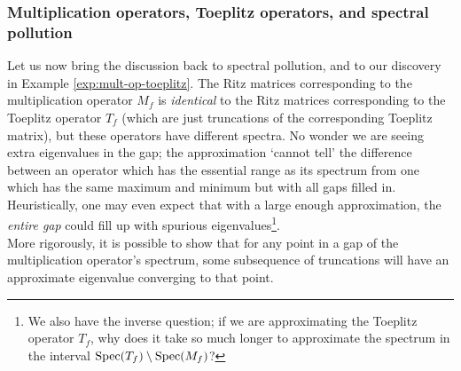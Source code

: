 \documentclass[../main.tex]{subfiles}
\begin{document}
\subsubsection{Multiplication operators, Toeplitz operators, and spectral pollution}
Let us now bring the discussion back to spectral pollution, and to our discovery in Example \ref{exp:mult-op-toeplitz}. The Ritz matrices corresponding to the
multiplication operator $M_f$ is \emph{identical} to the Ritz matrices corresponding to the Toeplitz operator $T_f$ (which are just truncations of the 
corresponding Toeplitz matrix), but these operators have different spectra. No wonder we are seeing extra eigenvalues in the gap; the approximation
`cannot tell' the difference between an operator which has the essential range as its spectrum from one which has the same maximum and minimum but with
all gaps filled in. Heuristically, one may even expect that with a large enough approximation, the \emph{entire gap} could fill up with spurious
eigenvalues\footnote{We also have the inverse question; if we are approximating the Toeplitz operator $T_f$, why does it take so much longer to 
approximate the spectrum in the interval $\mathrm{Spec}(T_f) \setminus \mathrm{Spec}(M_f)$?}.\\

More rigorously, it is possible to show that for any point in a gap of the multiplication operator's spectrum, some subsequence of truncations will have 
an approximate eigenvalue converging to that point. 
\end{document}
